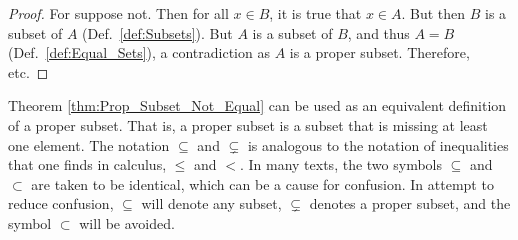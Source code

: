             \begin{proof}
                For suppose not. Then for all $x\in{B}$,
                it is true that $x\in{A}$. But then
                $B$ is a subset of $A$ (Def.~\ref{def:Subsets}).
                But $A$ is a subset of $B$, and thus $A=B$
                (Def.~\ref{def:Equal_Sets}), a contradiction as
                $A$ is a proper subset. Therefore, etc.
            \end{proof}
            Theorem \ref{thm:Prop_Subset_Not_Equal} can
            be used as an equivalent definition of a proper
            subset. That is, a proper subset is a subset that
            is missing at least one element. The notation
            $\subseteq$ and $\subsetneq$ is analogous to the
            notation of inequalities that one finds in calculus,
            $\leq$ and $<$. In many texts, the two symbols
            $\subseteq$ and $\subset$ are taken to be identical,
            which can be a cause for confusion. In attempt to
            reduce confusion, $\subseteq$ will denote any subset,
            $\subsetneq$ denotes a proper subset, and the symbol
            $\subset$ will be avoided.
